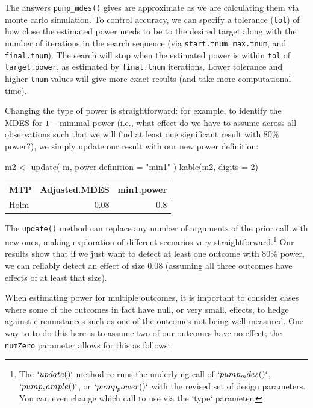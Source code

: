 \documentclass[
]{article}
\newenvironment{Shaded}{\begin{snugshade}}{\end{snugshade}}
\newcommand{\AttributeTok}[1]{\textcolor[rgb]{0.77,0.63,0.00}{#1}}
\newcommand{\DecValTok}[1]{\textcolor[rgb]{0.00,0.00,0.81}{#1}}
\newcommand{\FunctionTok}[1]{\textcolor[rgb]{0.00,0.00,0.00}{#1}}
\newcommand{\NormalTok}[1]{#1}
\newcommand{\OtherTok}[1]{\textcolor[rgb]{0.56,0.35,0.01}{#1}}
\newcommand{\StringTok}[1]{\textcolor[rgb]{0.31,0.60,0.02}{#1}}
\begin{document}
The answers \texttt{pump\_mdes()} gives are approximate as we are
calculating them via monte carlo simulation. To control accuracy, we can
specify a tolerance (\texttt{tol}) of how close the estimated power
needs to be to the desired target along with the number of iterations in
the search sequence (via \texttt{start.tnum}, \texttt{max.tnum}, and
\texttt{final.tnum}). The search will stop when the estimated power is
within \texttt{tol} of \texttt{target.power}, as estimated by
\texttt{final.tnum} iterations. Lower tolerance and higher \texttt{tnum}
values will give more exact results (and take more computational time).

Changing the type of power is straightforward: for example, to identify
the MDES for \(1-\)minimal power (i.e., what effect do we have to assume
across all observations such that we will find at least one significant
result with 80\% power?), we simply update our result with our new power
definition:

\begin{Shaded}
\begin{Highlighting}[]
\NormalTok{m2 }\OtherTok{\textless{}{-}} \FunctionTok{update}\NormalTok{( m, }\AttributeTok{power.definition =} \StringTok{"min1"}\NormalTok{ )}
\FunctionTok{kable}\NormalTok{(m2, }\AttributeTok{digits =} \DecValTok{2}\NormalTok{)}
\end{Highlighting}
\end{Shaded}

\begin{tabular}{l|r|r}
\hline
MTP & Adjusted.MDES & min1.power\\
\hline
Holm & 0.08 & 0.8\\
\hline
\end{tabular}

The \texttt{update()} method can replace any number of arguments of the
prior call with new ones, making exploration of different scenarios very
straightforward.\footnote{The $`update()`$ method re-runs the underlying call of $`pump_mdes()`$, $`pump_sample()`$, or $`pump_power()`$ with the revised set of design parameters. You can even change which call to use via the `type` parameter.}
Our results show that if we just want to detect at least one outcome
with 80\% power, we can reliably detect an effect of size \(0.08\)
(assuming all three outcomes have effects of at least that size).

When estimating power for multiple outcomes, it is important to consider
cases where some of the outcomes in fact have null, or very small,
effects, to hedge against circumstances such as one of the outcomes not
being well measured. One way to to do this here is to assume two of our
outcomes have no effect; the \texttt{numZero} parameter allows for this
as follows:
\end{document}
